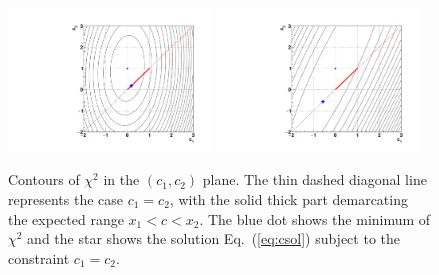 \documentclass[11pt]{article}
\newcommand{\xa}   {x_1}
\newcommand{\xb}   {x_2}
\newcommand{\ca}{c_1}
\newcommand{\cb}{c_2}
\begin{document}
\begin{figure}[hb]
\begin{center}
\includegraphics[width=0.48\textwidth]{contours_0p1.pdf}
\includegraphics[width=0.48\textwidth]{contours_0p9.pdf}
\caption[.]{\label{fig:chisq2D}
Contours of $\chi^2$ in the $(\ca,\cb)$ plane.
The thin dashed diagonal line represents the case $\ca = \cb$,
with the solid thick part demarcating the expected range
$\xa < c < \xb$.  The blue dot shows the minimum of
$\chi^2$ and the star shows the solution Eq.~(\ref{eq:csol})
subject to the constraint $\ca = \cb$.}
\end{center}
\end{figure}

\end{document}
